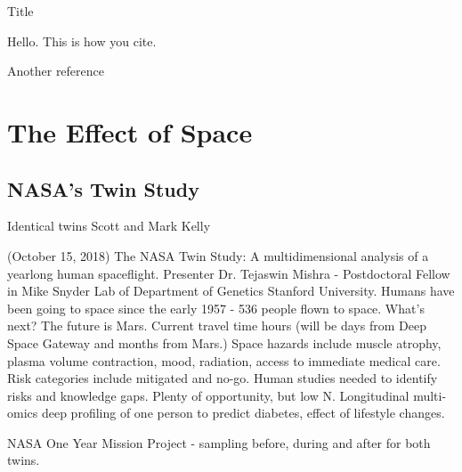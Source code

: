 \documentclass[a4paper, 11pt]{article}
\begin{document}
\tableofcontents

   Title
   
   Hello. This is how you cite. \cite{gustafsson2016best}
   
   Another reference \cite{hamid2015surface}
   
    \section{The Effect of Space}
    \subsection{NASA's Twin Study}
     Identical twins Scott and Mark Kelly 
     
    (October 15, 2018) The NASA Twin Study: A multidimensional analysis of a yearlong human spaceflight. Presenter Dr. Tejaswin Mishra - Postdoctoral Fellow in Mike Snyder Lab of  Department of Genetics Stanford University. 
    Humans have been going to space since the early 1957 - 536 people flown to space. What's next?
    The future is Mars. Current travel time hours (will be days from Deep Space Gateway and months from Mars.) Space hazards include muscle atrophy, plasma volume contraction, mood, radiation, access to immediate medical care. Risk categories include mitigated and no-go. 
    Human studies needed to identify risks and knowledge gaps. Plenty of opportunity, but low N. Longitudinal multi-omics deep profiling of one person to predict diabetes, effect of lifestyle changes.
    
    NASA One Year Mission Project - sampling before, during and after for both twins. 
    
\end{document}
